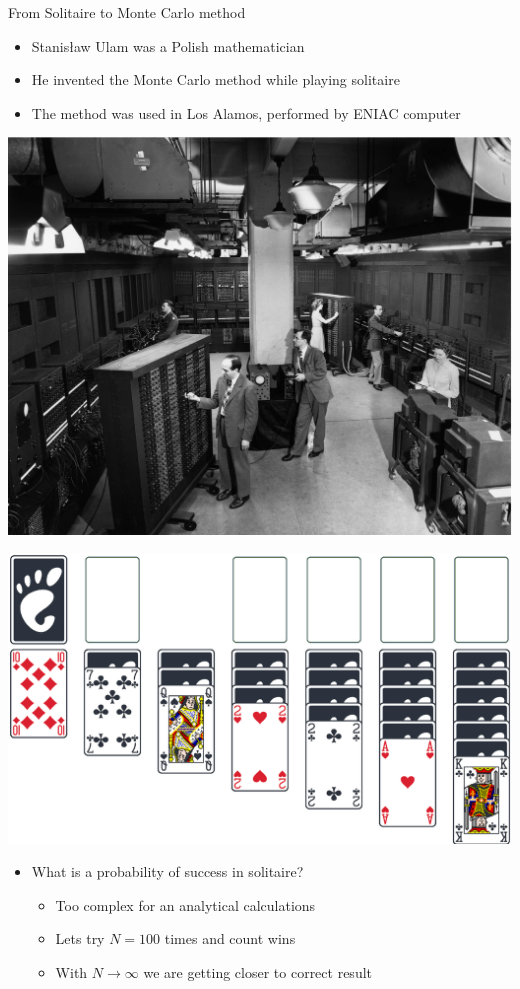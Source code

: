 \begin{wideslide}[toc = From Solitaire to MC]{From Solitaire to Monte Carlo method}
\null\vfill

    \twocolumn
    {
      \begin{itemize}
	\item Stanis{\l}aw Ulam was a Polish mathematician
	\item He invented the Monte Carlo method while playing solitaire
	\item The method was used in Los Alamos, performed by ENIAC computer
      \end{itemize}  
      
      \includegraphics[width=\columnwidth]{img/eniac1946.eps}
    }
    {
      \includegraphics[width=\columnwidth]{img/solitaire.eps}
      \begin{itemize}
	\item What is a probability of success in solitaire?
	\begin{itemize}
	  \item Too complex for an analytical calculations
	  \item Lets try $N = 100$ times and count wins
	  \item With $N \rightarrow \infty$ we are getting closer to correct result
	\end{itemize}
      \end{itemize}
    }
 
\vfill\null
\end{wideslide}

